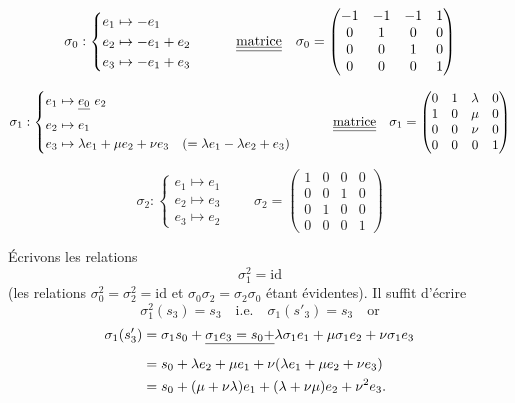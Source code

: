 \documentclass[11pt,a4paper]{article}
\begin{document}
\[ \sigma_0 : \begin{cases} e_1 \mapsto -e_1 \\ e_2 \mapsto -e_1 + e_2 \\ e_3 \mapsto -e_1 + e_3 \end{cases}
\qquad \struck{\uncertain{\text{matrice}}} \quad
\sigma_0 = \begin{pmatrix} -1 & -1 & -1 & 1 \\ 0 & 1 & 0 & 0 \\ 0 & 0 & 1 & 0 \\ 0 & 0 & 0 & 1 \end{pmatrix} \]

\[ \sigma_1 : \begin{cases} e_1 \mapsto \struck{e_0}\ e_2 \\ e_2 \mapsto e_1 \\ e_3 \mapsto \lambda e_1 + \mu e_2 + \nu e_3 \quad (= \lambda e_1 - \lambda e_2 + e_3) \end{cases}
\qquad \struck{\uncertain{\text{matrice}}} \quad
\sigma_1 = \begin{pmatrix} 0 & 1 & \lambda & 0 \\ 1 & 0 & \mu & 0 \\ 0 & 0 & \nu & 0 \\ 0 & 0 & 0 & 1 \end{pmatrix} \]

\[ \sigma_2 : \begin{cases} e_1 \mapsto e_1 \\ e_2 \mapsto e_3 \\ e_3 \mapsto e_2 \end{cases}
\qquad
\sigma_2 = \begin{pmatrix} 1 & 0 & 0 & 0 \\ 0 & 0 & 1 & 0 \\ 0 & 1 & 0 & 0 \\ 0 & 0 & 0 & 1 \end{pmatrix} \]

Écrivons les relations
\[ \sigma_1^2 = \mathrm{id} \]
(les relations $\sigma_0^2 = \sigma_2^2 = \mathrm{id}$ et $\sigma_0\sigma_2 = \sigma_2\sigma_0$ étant évidentes). Il suffit d'écrire
\[ \sigma_1^2(s_3) = s_3 \quad \text{i.e.} \quad \sigma_1(s'_3) = s_3 \quad \text{or} \]
\begin{align*}
\sigma_1(s'_3) &= \sigma_1 s_0 + \struck{\sigma_1 e_3 = s_0 +} \lambda\sigma_1 e_1 + \mu\sigma_1 e_2 + \nu\sigma_1 e_3 \\
&= s_0 + \lambda e_2 + \mu e_1 + \nu(\lambda e_1 + \mu e_2 + \nu e_3) \\
&= s_0 + (\mu + \nu\lambda) e_1 + (\lambda + \nu\mu) e_2 + \nu^2 e_3 .
\end{align*}
\end{document}
